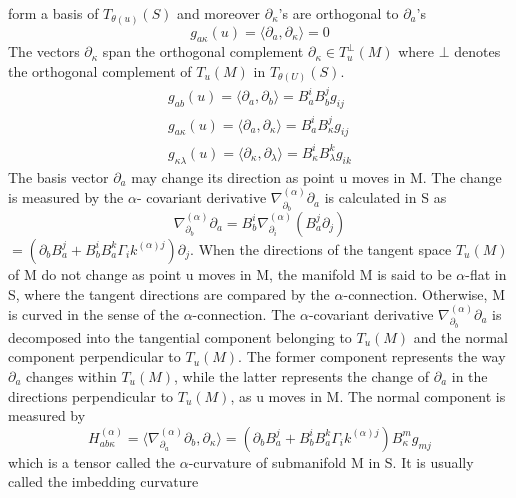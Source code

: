 form a basis of $T_{\theta(u)}(S)$ and moreover $\partial_\kappa$'s are orthogonal to $\partial_a$'s 
\begin{equation*}
 g_{a \kappa} (u) = \langle \partial_a, \partial_\kappa \rangle = 0 
\end{equation*}
  The vectors $\partial_\kappa$ span the orthogonal complement $\partial_{\kappa} \in T_{u}^{\bot}(M)$ where
  $\bot$ denotes the orthogonal complement of $T_{u}(M)$ in $T_{\theta(U)}(S)$. 
  \begin{eqnarray}
   g_{ab}(u) = \langle \partial_a, \partial_b \rangle = B_a^i B_b^j g_{ij} \\
   g_{a \kappa}(u) = \langle \partial_a, \partial_\kappa \rangle = B_a^i B_\kappa^j g_{ij} \\
    g_{\kappa \lambda}(u) = \langle \partial_\kappa, \partial_\lambda \rangle = B_\kappa^i B_\lambda^k g_{ik} 
  \end{eqnarray}
The basis vector $\partial_a$ may change its direction as point u moves in M. The change is measured by the $\alpha$-
covariant derivative $\nabla_{\partial_{b}}^{(\alpha)}\partial_a$ is calculated in S as 
\begin{equation*}
 \nabla_{\partial_{b}}^{(\alpha)} \partial_a = B_b^i \nabla_{\partial_{i}}^{(\alpha)}(B_a^j \partial_j) 
\end{equation*}
 $=(\partial_b B_a^j + B_b^i B_a^k \Gamma_ik^{(\alpha)j})\partial_j$. 
 When the directions of the tangent space $T_u(M)$ of M do not change as point u moves in M, 
 the manifold M is said to be $\alpha$-flat in S, where the tangent directions are compared by the
 $\alpha$-connection. Otherwise, M is curved in the sense of the $\alpha$-connection. 
 The $\alpha$-covariant derivative $\nabla_{\partial_{b}}^{(\alpha)} \partial_a$ is decomposed into the 
 tangential component belonging to $T_{u}(M)$ and the normal component perpendicular to $T_u(M)$.
    The former component represents the way $\partial_a$ changes within $T_u(M)$, while the latter represents the change
    of $\partial_a$ in the directions perpendicular to $T_u(M)$, as u moves in M. The normal component is measured by
    \begin{equation}
     H_{ab \kappa}^{(\alpha)} = \langle \nabla_{\partial_{a}}^{(\alpha)} \partial_b, \partial_\kappa \rangle 
     = \left( \partial_b B^j_a + B^i_bB_a^k \Gamma_ik^{(\alpha)j}\right)B_\kappa^m g_{mj}
    \end{equation}
which is a tensor called the $\alpha$-curvature of submanifold M in S. It is usually called the imbedding curvature
